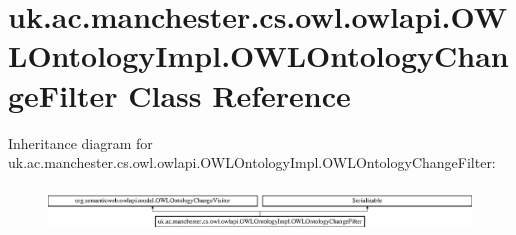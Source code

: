\hypertarget{classuk_1_1ac_1_1manchester_1_1cs_1_1owl_1_1owlapi_1_1_o_w_l_ontology_impl_1_1_o_w_l_ontology_change_filter}{\section{uk.\-ac.\-manchester.\-cs.\-owl.\-owlapi.\-O\-W\-L\-Ontology\-Impl.\-O\-W\-L\-Ontology\-Change\-Filter Class Reference}
\label{classuk_1_1ac_1_1manchester_1_1cs_1_1owl_1_1owlapi_1_1_o_w_l_ontology_impl_1_1_o_w_l_ontology_change_filter}
}
Inheritance diagram for uk.\-ac.\-manchester.\-cs.\-owl.\-owlapi.\-O\-W\-L\-Ontology\-Impl.\-O\-W\-L\-Ontology\-Change\-Filter\-:\begin{figure}[H]
\begin{center}
\leavevmode
\includegraphics[height=1.214751cm]{classuk_1_1ac_1_1manchester_1_1cs_1_1owl_1_1owlapi_1_1_o_w_l_ontology_impl_1_1_o_w_l_ontology_change_filter}
\end{center}
\end{figure}
